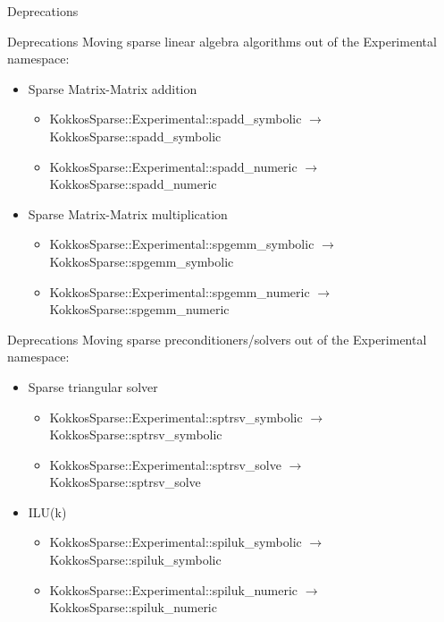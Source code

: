 \begin{frame}[fragile]

  {\Huge Deprecations}

  \vspace{10pt}

\end{frame}

\begin{frame}[fragile]{Deprecations}
  Moving sparse linear algebra algorithms out of the {\ttfamily Experimental} namespace:
  \begin{itemize}
  \item Sparse Matrix-Matrix addition
    \begin{itemize}
    \item {\ttfamily KokkosSparse::Experimental::spadd\_symbolic} $\rightarrow$ {\ttfamily KokkosSparse::spadd\_symbolic}
    \item {\ttfamily KokkosSparse::Experimental::spadd\_numeric} $\rightarrow$ {\ttfamily KokkosSparse::spadd\_numeric}
    \end{itemize}
  \item Sparse Matrix-Matrix multiplication
    \begin{itemize}
    \item {\ttfamily KokkosSparse::Experimental::spgemm\_symbolic} $\rightarrow$ {\ttfamily KokkosSparse::spgemm\_symbolic}
    \item {\ttfamily KokkosSparse::Experimental::spgemm\_numeric} $\rightarrow$ {\ttfamily KokkosSparse::spgemm\_numeric}
    \end{itemize}
  \end{itemize}
\end{frame}

\begin{frame}[fragile]{Deprecations}
  Moving sparse preconditioners/solvers out of the {\ttfamily Experimental} namespace:
  \begin{itemize}
  \item Sparse triangular solver
    \begin{itemize}
    \item {\ttfamily KokkosSparse::Experimental::sptrsv\_symbolic} $\rightarrow$ {\ttfamily KokkosSparse::sptrsv\_symbolic}
    \item {\ttfamily KokkosSparse::Experimental::sptrsv\_solve} $\rightarrow$ {\ttfamily KokkosSparse::sptrsv\_solve}
    \end{itemize}
  \item ILU(k)
    \begin{itemize}
    \item {\ttfamily KokkosSparse::Experimental::spiluk\_symbolic} $\rightarrow$ {\ttfamily KokkosSparse::spiluk\_symbolic}
    \item {\ttfamily KokkosSparse::Experimental::spiluk\_numeric} $\rightarrow$ {\ttfamily KokkosSparse::spiluk\_numeric}
    \end{itemize}
  \end{itemize}
\end{frame}

